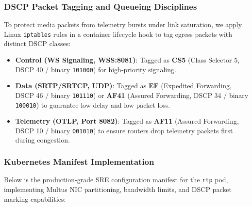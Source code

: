 \documentclass{article}
\begin{document}
\subsubsection{DSCP Packet Tagging and Queueing Disciplines}

To protect media packets from telemetry bursts under link saturation, we apply Linux \texttt{iptables}
rules in a container lifecycle hook to tag egress packets with distinct DSCP classes:

\begin{itemize}
    \item \textbf{Control (WS Signaling, WSS:8081)}: Tagged as \textbf{CS5} (Class Selector 5, DSCP 40 / binary \texttt{101000}) for high-priority signaling.
    \item \textbf{Data (SRTP/SRTCP, UDP)}: Tagged as \textbf{EF} (Expedited Forwarding, DSCP 46 / binary \texttt{101110}) or \textbf{AF41} (Assured Forwarding, DSCP 34 / binary \texttt{100010}) to guarantee low delay and low packet loss.
    \item \textbf{Telemetry (OTLP, Port 8082)}: Tagged as \textbf{AF11} (Assured Forwarding, DSCP 10 / binary \texttt{001010}) to ensure routers drop telemetry packets first during congestion.
\end{itemize}

\newpage
\subsubsection{Kubernetes Manifest Implementation}

Below is the production-grade SRE configuration manifest for the \texttt{rtp} pod,
implementing Multus NIC partitioning, bandwidth limits, and DSCP packet marking capabilities:
\end{document}
